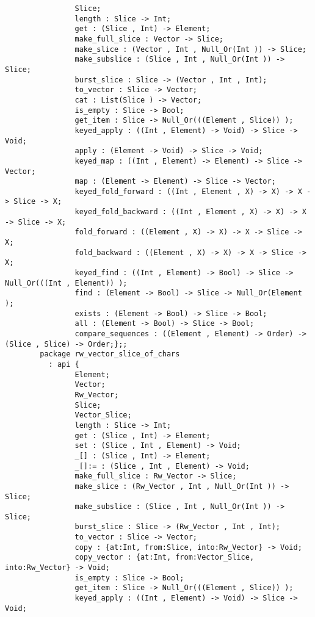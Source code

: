 \begin{verbatim}
                Slice;
                length : Slice -> Int;
                get : (Slice , Int) -> Element;
                make_full_slice : Vector -> Slice;
                make_slice : (Vector , Int , Null_Or(Int )) -> Slice;
                make_subslice : (Slice , Int , Null_Or(Int )) -> Slice;
                burst_slice : Slice -> (Vector , Int , Int);
                to_vector : Slice -> Vector;
                cat : List(Slice ) -> Vector;
                is_empty : Slice -> Bool;
                get_item : Slice -> Null_Or(((Element , Slice)) );
                keyed_apply : ((Int , Element) -> Void) -> Slice -> Void;
                apply : (Element -> Void) -> Slice -> Void;
                keyed_map : ((Int , Element) -> Element) -> Slice -> Vector;
                map : (Element -> Element) -> Slice -> Vector;
                keyed_fold_forward : ((Int , Element , X) -> X) -> X -> Slice -> X;
                keyed_fold_backward : ((Int , Element , X) -> X) -> X -> Slice -> X;
                fold_forward : ((Element , X) -> X) -> X -> Slice -> X;
                fold_backward : ((Element , X) -> X) -> X -> Slice -> X;
                keyed_find : ((Int , Element) -> Bool) -> Slice -> Null_Or(((Int , Element)) );
                find : (Element -> Bool) -> Slice -> Null_Or(Element );
                exists : (Element -> Bool) -> Slice -> Bool;
                all : (Element -> Bool) -> Slice -> Bool;
                compare_sequences : ((Element , Element) -> Order) -> (Slice , Slice) -> Order;};;
        package rw_vector_slice_of_chars
          : api {
                Element;
                Vector;
                Rw_Vector;
                Slice;
                Vector_Slice;
                length : Slice -> Int;
                get : (Slice , Int) -> Element;
                set : (Slice , Int , Element) -> Void;
                _[] : (Slice , Int) -> Element;
                _[]:= : (Slice , Int , Element) -> Void;
                make_full_slice : Rw_Vector -> Slice;
                make_slice : (Rw_Vector , Int , Null_Or(Int )) -> Slice;
                make_subslice : (Slice , Int , Null_Or(Int )) -> Slice;
                burst_slice : Slice -> (Rw_Vector , Int , Int);
                to_vector : Slice -> Vector;
                copy : {at:Int, from:Slice, into:Rw_Vector} -> Void;
                copy_vector : {at:Int, from:Vector_Slice, into:Rw_Vector} -> Void;
                is_empty : Slice -> Bool;
                get_item : Slice -> Null_Or(((Element , Slice)) );
                keyed_apply : ((Int , Element) -> Void) -> Slice -> Void;

\end{verbatim}
